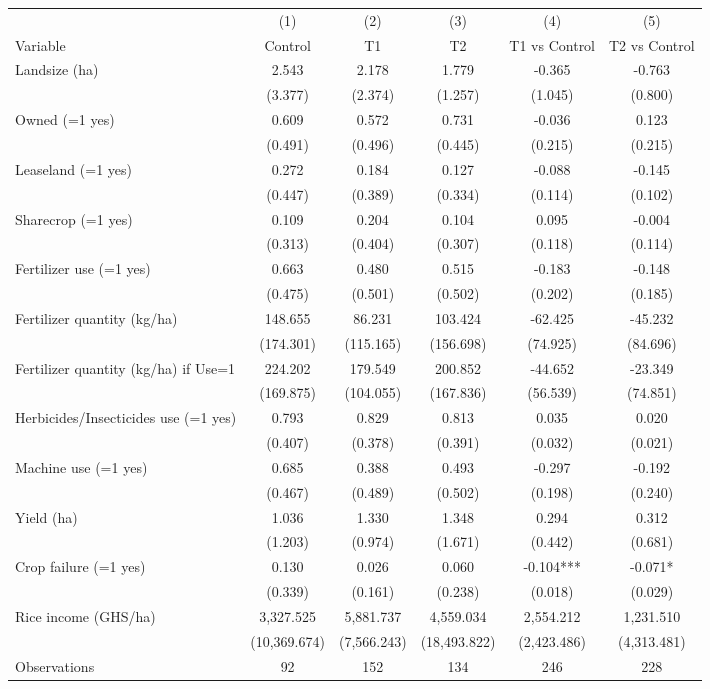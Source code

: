 \begin{tabular}{l*{5}c}
\hline\hline
 & (1) & (2) & (3) & (4) & (5) \\
Variable & Control & T1 & T2 & T1 vs Control & T2 vs Control \\
\hline
Landsize (ha)&2.543&2.178&1.779&-0.365&-0.763\\
&(3.377)&(2.374)&(1.257)&(1.045)&(0.800)\\
Owned (=1 yes)&0.609&0.572&0.731&-0.036&0.123\\
&(0.491)&(0.496)&(0.445)&(0.215)&(0.215)\\
Leaseland (=1 yes)&0.272&0.184&0.127&-0.088&-0.145\\
&(0.447)&(0.389)&(0.334)&(0.114)&(0.102)\\
Sharecrop (=1 yes)&0.109&0.204&0.104&0.095&-0.004\\
&(0.313)&(0.404)&(0.307)&(0.118)&(0.114)\\
Fertilizer use (=1 yes)&0.663&0.480&0.515&-0.183&-0.148\\
&(0.475)&(0.501)&(0.502)&(0.202)&(0.185)\\
Fertilizer quantity (kg/ha)&148.655&86.231&103.424&-62.425&-45.232\\
&(174.301)&(115.165)&(156.698)&(74.925)&(84.696)\\
Fertilizer quantity (kg/ha) if Use=1&224.202&179.549&200.852&-44.652&-23.349\\
&(169.875)&(104.055)&(167.836)&(56.539)&(74.851)\\
Herbicides/Insecticides use (=1 yes)&0.793&0.829&0.813&0.035&0.020\\
&(0.407)&(0.378)&(0.391)&(0.032)&(0.021)\\
Machine use (=1 yes)&0.685&0.388&0.493&-0.297&-0.192\\
&(0.467)&(0.489)&(0.502)&(0.198)&(0.240)\\
Yield (ha)&1.036&1.330&1.348&0.294&0.312\\
&(1.203)&(0.974)&(1.671)&(0.442)&(0.681)\\
Crop failure (=1 yes)&0.130&0.026&0.060&-0.104***&-0.071*\\
&(0.339)&(0.161)&(0.238)&(0.018)&(0.029)\\
Rice income (GHS/ha)&3,327.525&5,881.737&4,559.034&2,554.212&1,231.510\\
&(10,369.674)&(7,566.243)&(18,493.822)&(2,423.486)&(4,313.481)\\
\hline
Observations & 92 & 152 & 134 & 246 & 228 \\
\hline\hline
\end{tabular}
